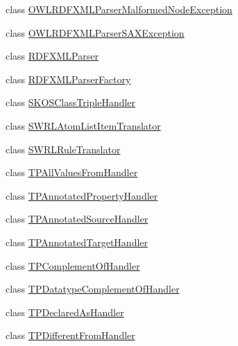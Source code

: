 \begin{DoxyCompactItemize}
class \hyperlink{classorg_1_1coode_1_1owlapi_1_1rdfxml_1_1parser_1_1_o_w_l_r_d_f_x_m_l_parser_malformed_node_exception}{O\-W\-L\-R\-D\-F\-X\-M\-L\-Parser\-Malformed\-Node\-Exception}
\item 
class \hyperlink{classorg_1_1coode_1_1owlapi_1_1rdfxml_1_1parser_1_1_o_w_l_r_d_f_x_m_l_parser_s_a_x_exception}{O\-W\-L\-R\-D\-F\-X\-M\-L\-Parser\-S\-A\-X\-Exception}
\item 
class \hyperlink{classorg_1_1coode_1_1owlapi_1_1rdfxml_1_1parser_1_1_r_d_f_x_m_l_parser}{R\-D\-F\-X\-M\-L\-Parser}
\item 
class \hyperlink{classorg_1_1coode_1_1owlapi_1_1rdfxml_1_1parser_1_1_r_d_f_x_m_l_parser_factory}{R\-D\-F\-X\-M\-L\-Parser\-Factory}
\item 
class \hyperlink{classorg_1_1coode_1_1owlapi_1_1rdfxml_1_1parser_1_1_s_k_o_s_class_triple_handler}{S\-K\-O\-S\-Class\-Triple\-Handler}
\item 
class \hyperlink{classorg_1_1coode_1_1owlapi_1_1rdfxml_1_1parser_1_1_s_w_r_l_atom_list_item_translator}{S\-W\-R\-L\-Atom\-List\-Item\-Translator}
\item 
class \hyperlink{classorg_1_1coode_1_1owlapi_1_1rdfxml_1_1parser_1_1_s_w_r_l_rule_translator}{S\-W\-R\-L\-Rule\-Translator}
\item 
class \hyperlink{classorg_1_1coode_1_1owlapi_1_1rdfxml_1_1parser_1_1_t_p_all_values_from_handler}{T\-P\-All\-Values\-From\-Handler}
\item 
class \hyperlink{classorg_1_1coode_1_1owlapi_1_1rdfxml_1_1parser_1_1_t_p_annotated_property_handler}{T\-P\-Annotated\-Property\-Handler}
\item 
class \hyperlink{classorg_1_1coode_1_1owlapi_1_1rdfxml_1_1parser_1_1_t_p_annotated_source_handler}{T\-P\-Annotated\-Source\-Handler}
\item 
class \hyperlink{classorg_1_1coode_1_1owlapi_1_1rdfxml_1_1parser_1_1_t_p_annotated_target_handler}{T\-P\-Annotated\-Target\-Handler}
\item 
class \hyperlink{classorg_1_1coode_1_1owlapi_1_1rdfxml_1_1parser_1_1_t_p_complement_of_handler}{T\-P\-Complement\-Of\-Handler}
\item 
class \hyperlink{classorg_1_1coode_1_1owlapi_1_1rdfxml_1_1parser_1_1_t_p_datatype_complement_of_handler}{T\-P\-Datatype\-Complement\-Of\-Handler}
\item 
class \hyperlink{classorg_1_1coode_1_1owlapi_1_1rdfxml_1_1parser_1_1_t_p_declared_as_handler}{T\-P\-Declared\-As\-Handler}
\item 
class \hyperlink{classorg_1_1coode_1_1owlapi_1_1rdfxml_1_1parser_1_1_t_p_different_from_handler}{T\-P\-Different\-From\-Handler}

\end{DoxyCompactItemize}
